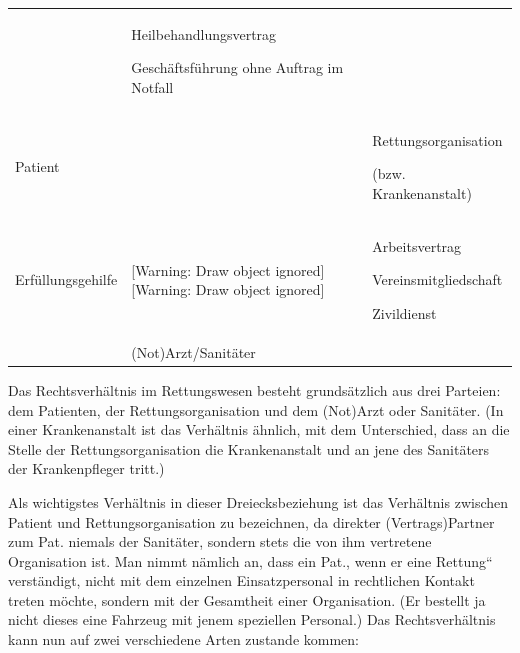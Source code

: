 \documentclass{article}
\begin{document}
\begin{flushleft}
\tablehead{}\begin{supertabular}{m{3.3cm}m{5.6210003cm}m{4.1730003cm}}
 &
\centering Heilbehandlungsvertrag \par

\centering Gesch\"aftsf\"uhrung ohne Auftrag im Notfall\par

 &
\\
\raggedleft Patient\par

 &
\par

 &
Rettungsorganisation

(bzw. Krankenanstalt)

\\
\raggedleft Erf\"ullungsgehilfe\par

 &
[Warning: Draw object ignored]  [Warning: Draw object ignored]

 &
Arbeitsvertrag

Vereinsmitgliedschaft

Zivildienst

\\
 &
\centering (Not)Arzt/Sanit\"ater\par

 &
\\
\end{supertabular}
\end{flushleft}
Das Rechtsverh\"altnis im Rettungswesen besteht grunds\"atzlich aus drei
Parteien: dem Patienten, der Rettungsorganisation und dem (Not)Arzt
oder Sanit\"ater. (In einer Krankenanstalt ist das Verh\"altnis
\"ahnlich, mit dem Unterschied, dass an die Stelle der
Rettungsorganisation die Krankenanstalt und an jene des Sanit\"aters
der Krankenpfleger tritt.)

Als wichtigstes Verh\"altnis in dieser Dreiecksbeziehung ist das
Verh\"altnis zwischen Patient und Rettungsorganisation zu bezeichnen,
da direkter (Vertrags)Partner zum Pat. niemals der Sanit\"ater, sondern
stets die von ihm vertretene Organisation ist. Man nimmt n\"amlich an,
dass ein Pat., wenn er eine {\quotedblbase}Rettung{\textquotedblleft}
verst\"andigt, nicht mit dem einzelnen Einsatzpersonal in rechtlichen
Kontakt treten m\"ochte, sondern mit der Gesamtheit einer Organisation.
(Er bestellt ja nicht dieses eine Fahrzeug mit jenem speziellen
Personal.) Das Rechtsverh\"altnis kann nun auf zwei verschiedene Arten
zustande kommen:
\end{document}
